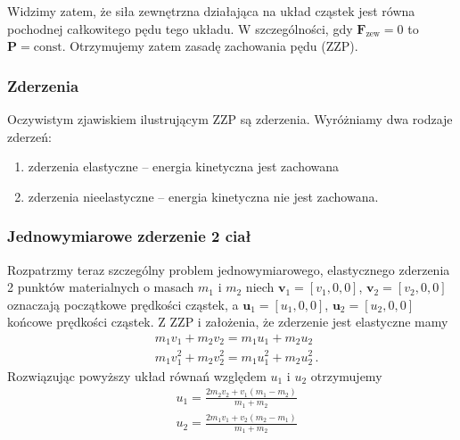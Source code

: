 \documentclass[../main.tex]{subfiles}
\begin{document}
Widzimy zatem, że siła zewnętrzna działająca na układ cząstek jest równa pochodnej całkowitego pędu tego układu. W szczególności, gdy \(\mathbf{F}_\text{zew}=0\) to \(\mathbf{P}=\text{const}\). Otrzymujemy zatem zasadę zachowania pędu (ZZP).
\medskip

\noindent{}
\subsubsection{Zderzenia}
Oczywistym zjawiskiem ilustrującym ZZP są zderzenia. Wyróżniamy dwa rodzaje zderzeń:
\begin{enumerate}
    \item zderzenia elastyczne -- energia kinetyczna jest zachowana 
    \item zderzenia nieelastyczne -- energia kinetyczna nie jest zachowana. 
\end{enumerate}
\subsubsection*{Jednowymiarowe zderzenie 2 ciał}
Rozpatrzmy teraz szczególny problem jednowymiarowego, elastycznego zderzenia 2 punktów materialnych o masach \(m_1\) i \(m_2\) niech \(\mathbf{v}_1=[v_1,0,0]\), \(\mathbf{v}_2=[v_2,0,0]\) oznaczają początkowe prędkości cząstek, a \(\mathbf{u}_1=[u_1,0,0]\), \(\mathbf{u}_2=[u_2,0,0]\) końcowe prędkości cząstek. Z ZZP i założenia, że zderzenie jest elastyczne mamy
\begin{equation*}
\begin{split}
    &m_1v_1+m_2v_2=m_1u_1+m_2u_2\\
    &m_1v_1^2+m_2v_2^2=m_1u_1^2+m_2u_2^2\,.
\end{split}
\end{equation*}
Rozwiązując powyższy układ równań względem \(u_1\) i \(u_2\) otrzymujemy
\begin{equation*}
    \begin{split}
        &u_1=\frac{2m_2v_2+v_1(m_1-m_2)}{m_1+m_2}\\
        &u_2=\frac{2m_1v_1+v_2(m_2-m_1)}{m_1+m_2}
    \end{split}
\end{equation*}
\end{document}
